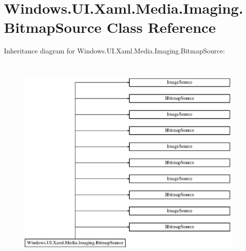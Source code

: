 \hypertarget{class_windows_1_1_u_i_1_1_xaml_1_1_media_1_1_imaging_1_1_bitmap_source}{}\section{Windows.\+U\+I.\+Xaml.\+Media.\+Imaging.\+Bitmap\+Source Class Reference}
\label{class_windows_1_1_u_i_1_1_xaml_1_1_media_1_1_imaging_1_1_bitmap_source}
Inheritance diagram for Windows.\+U\+I.\+Xaml.\+Media.\+Imaging.\+Bitmap\+Source\+:\begin{figure}[H]
\begin{center}
\leavevmode
\includegraphics[height=10.807017cm]{class_windows_1_1_u_i_1_1_xaml_1_1_media_1_1_imaging_1_1_bitmap_source}
\end{center}
\end{figure}
